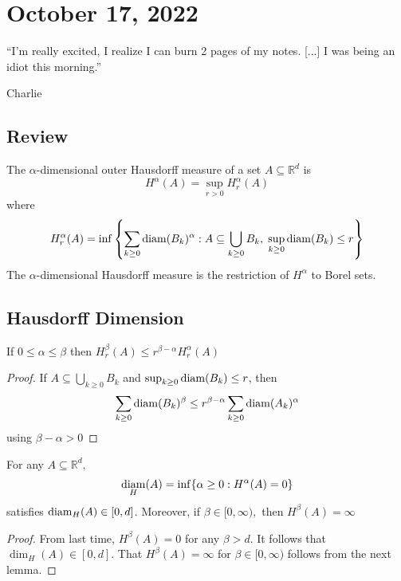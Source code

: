 \section{October 17, 2022}

\epigraph{``I'm really excited, I realize I can burn 2 pages of my notes. [...] I was being an idiot this morning.''}{Charlie}

\subsection*{Review}
The $\alpha$-dimensional outer Hausdorff measure of a set $A \subseteq \mathbb{R}^d$ is
\[
	H^{\alpha} (A) = \sup_{r > 0} H_{r}^{\alpha} (A)
\]
where
\[
	H_{r}^{\alpha} (A) = \inf\left\{ \sum_{k \geq 0} \operatorname*{diam} (B_k)^{\alpha} : A \subseteq \bigcup_{k \geq 0} B_k, \; \sup_{k \geq 0} \operatorname*{diam} (B_{k} ) \leq r \right\}
\]
The $\alpha$-dimensional Hausdorff measure is the restriction of $H^{\alpha}$ to Borel sets.

\subsection{Hausdorff Dimension}

\begin{lemma}
	If $0 \leq \alpha \leq \beta$ then $H^{\beta}_r (A) \leq r^{\beta - \alpha} H^{\alpha}_{r} (A)$
\end{lemma}

\begin{proof}
	If $A \subseteq \bigcup_{k \geq 0} B_{k}$ and $\sup_{k \geq 0} \operatorname*{diam} (B_{k}) \leq r$, 
	then 
	\begin{align*}
		\sum_{k \geq 0} \operatorname*{diam} (B_{k})^{\beta} \leq r^{\beta - \alpha} \sum_{k \geq 0} \operatorname*{diam} (A_{k})^{\alpha}
	\end{align*} 
	using $ \beta - \alpha > 0$
\end{proof}

\begin{theorem}
	For any $A \subseteq \mathbb{R}^{d},$ 
	\begin{align*}
		\operatorname*{diam}_{H}(A) = \inf \{\alpha \geq 0 : H^{\alpha}(A) = 0\}
	\end{align*} 
	satisfies $\operatorname*{diam}_{H}(A) \in [0, d]$. Moreover, if $\beta \in [0, \infty),$ then $H^{\beta}(A) = \infty$
\end{theorem}

\begin{proof}
	From last time, $H^{\beta}(A) = 0$ for any $\beta > d$. It follows that $\dim_{H}(A) \in [0, d]$.
	That $H^{\beta}(A) = \infty$ for $\beta \in [0, \infty)$ follows from the next lemma.
\end{proof}


